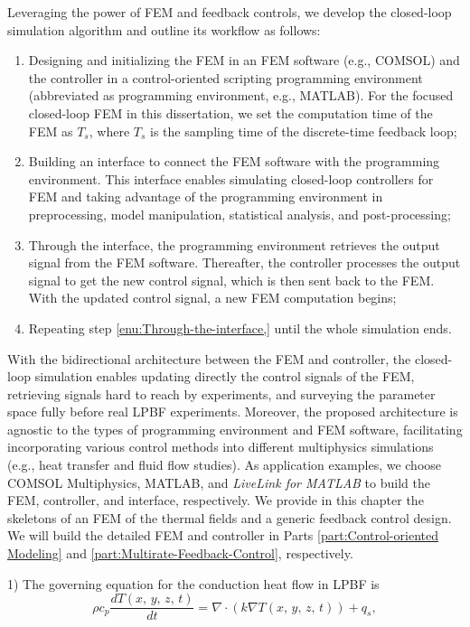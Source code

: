 \documentclass [11pt, proquest] {uwthesis}[2020/02/24]
\begin{document}
Leveraging the power of FEM and feedback controls, we develop the
closed-loop simulation algorithm and outline its workflow as follows:
\begin{enumerate}
\item Designing and initializing the FEM in an FEM software (e.g., COMSOL) and the controller in a control-oriented scripting programming environment (abbreviated as programming 
environment, e.g., MATLAB). For the focused closed-loop FEM in this dissertation, we set the computation time of the FEM as $T_{s}$, where $T_{s}$ is the sampling time of the discrete-time feedback loop;
\item Building an interface to connect the FEM software with the programming
environment. This interface enables simulating closed-loop controllers
for FEM and taking advantage of the programming environment in preprocessing,
model manipulation, statistical analysis, and post-processing; 
\item \label{enu:Through-the-interface,}Through the interface, the programming
environment retrieves the output signal from the FEM software. Thereafter,
the controller processes the output signal to get the new control
signal, which is then sent back to the FEM. With the updated control
signal, a new FEM computation begins;
\item Repeating step \ref{enu:Through-the-interface,} until the whole simulation
ends.
\end{enumerate}
With the bidirectional architecture between the FEM and controller,
the closed-loop simulation enables updating directly the control signals
of the FEM, retrieving signals hard to reach by experiments, and surveying
the parameter space fully before real LPBF experiments. Moreover, the
proposed architecture is agnostic to the types of programming environment
and FEM software, facilitating incorporating various control methods
into different multiphysics simulations (e.g., heat transfer and fluid
flow studies). As application examples, we choose COMSOL Multiphysics,
MATLAB, and \emph{LiveLink for MATLAB} to build the FEM, controller,
and interface, respectively. We provide in this chapter the skeletons
of an FEM of the thermal fields and a generic feedback control design. We
will build the detailed FEM and controller in Parts \ref{part:Control-oriented Modeling}
and \ref{part:Multirate-Feedback-Control}, respectively.

1) The governing equation for the conduction heat flow in LPBF is
\begin{equation}
\rho c_{p}\frac{dT(x,\,y,\,z,\,t)}{dt}=\nabla\cdot(k\nabla T(x,\,y,\,z,\,t))+q_{s},\label{eq:heat_conduction}
\end{equation}
\end{document}
